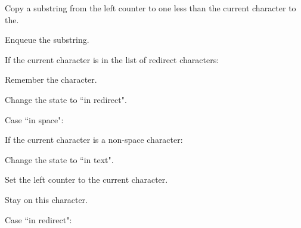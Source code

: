 \documentclass{article}
\begin{document}
\begin{deepenum}
\begin{deepenum}
\begin{deepenum}
\begin{deepenum}
\begin{deepenum}
                                        \item
                                            Copy a substring from the left counter to one less than the current character to the.
                                        \item
                                            Enqueue the substring.
                                    \end{deepenum}
                                \item
                                    If the current character is in the list of redirect characters:
                                    \begin{deepenum}
                                        \item
                                            Remember the character.
                                        \item
                                            Change the state to ``in redirect".
                                    \end{deepenum}
                            \end{deepenum}
                    \item
                        Case ``in space":
                            \begin{deepenum}
                                \item
                                    If the current character is a non-space character:
                                        \begin{deepenum}
                                            \item
                                                Change the state to ``in text".
                                            \item
                                                Set the left counter to the current character.
                                            \item
                                                Stay on this character.
                                        \end{deepenum}
                            \end{deepenum}
                    \item
                        Case ``in redirect":
                            \begin{deepenum}
                                \item

\end{deepenum}
\end{deepenum}
\end{deepenum}
\end{deepenum}
\end{document}
